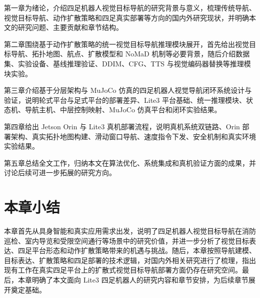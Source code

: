 第一章为绪论，介绍四足机器人视觉目标导航的研究背景与意义，梳理传统导航、视觉目标导航、动作扩散策略和四足真实部署等方向的国内外研究现状，并明确本文的研究问题、主要贡献和章节结构。

第二章围绕基于动作扩散策略的统一视觉目标导航推理模块展开，首先给出视觉目标导航、拓扑地图、航点、扩散模型和 NoMaD 机制等必要背景，随后介绍数据集、实验设备、基线推理验证、DDIM、CFG、TTS 与视觉编码器替换等推理模块实验。

第三章介绍基于分层架构与 MuJoCo 仿真的四足机器人视觉导航闭环系统设计与验证，说明轮式平台与足式平台的部署差异、Lite3 平台基础、统一推理模块、状态机、导航主机、中层控制映射、MuJoCo 仿真平台和闭环实验结果。

第四章给出 Jetson Orin 与 Lite3 真机部署流程，说明真机系统双链路、Orin 部署架构、真实拓扑地图构建、滑动窗口导航、速度指令下发、安全机制和真实环境实验结果。

第五章总结全文工作，归纳本文在算法优化、系统集成和真机验证方面的成果，并讨论后续可进一步拓展的研究方向。

\section{本章小结}

本章首先从具身智能和真实应用需求出发，说明了四足机器人视觉目标导航在消防巡检、室内导览和受限空间通行等场景中的研究价值，并进一步分析了视觉目标表达、四足平台形态和动作扩散策略带来的机遇与挑战。随后，本章按照导航建模、目标表达、扩散策略和四足部署的技术逻辑，对国内外相关研究进行了梳理，指出现有工作在真实四足平台上的扩散式视觉目标导航部署方面仍存在研究空间。最后，本章明确了本文面向 Lite3 四足机器人的研究内容和章节安排，为后续章节展开奠定基础。
